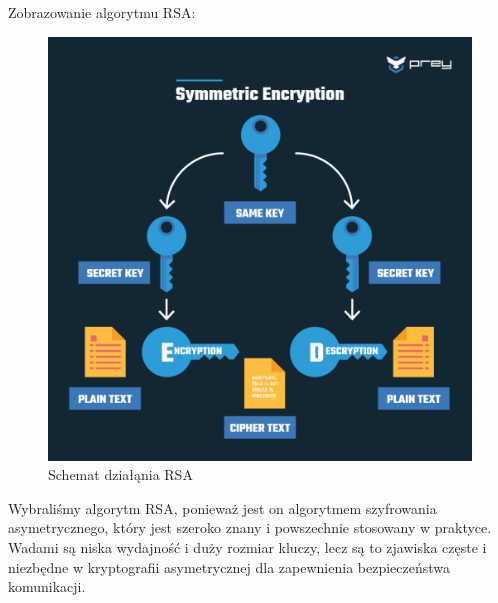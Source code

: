 \vspace{1em}

Zobrazowanie algorytmu RSA:

\begin{figure}[H]
    \centering
    \includegraphics[width=\textwidth]{Images/RSA1.png}
    \caption{Schemat działąnia RSA}
\label{fig:RSA1}
\end{figure}

Wybraliśmy algorytm RSA, ponieważ jest on algorytmem szyfrowania asymetrycznego, który jest szeroko znany i powszechnie stosowany w praktyce. Wadami są niska wydajność i duży rozmiar kluczy, lecz są to zjawiska częste i niezbędne w kryptografii asymetrycznej dla zapewnienia bezpieczeństwa komunikacji.
